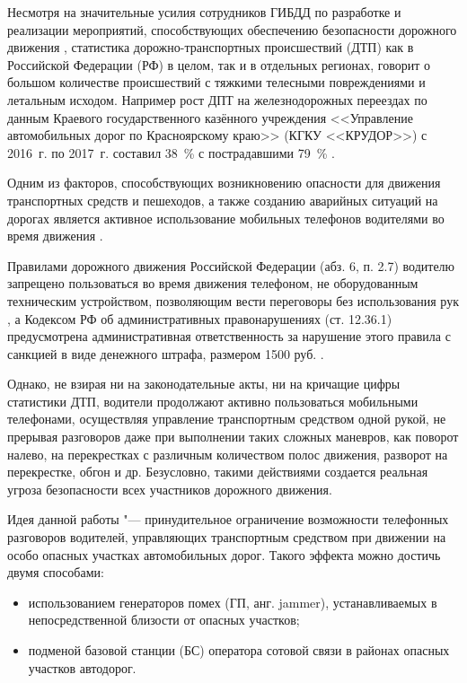 
Несмотря на значительные усилия сотрудников ГИБДД по разработке и реализации мероприятий, способствующих обеспечению безопасности дорожного движения \cite{KrudorCam}, статистика дорожно-транспортных происшествий (ДТП) как в Российской Федерации (РФ) в целом, так и в отдельных регионах, говорит о большом количестве происшествий с тяжкими телесными повреждениями и летальным исходом. Например рост ДПТ на железнодорожных переездах по данным Краевого государственного казённого учреждения <<Управление автомобильных дорог по Красноярскому краю>> (КГКУ <<КРУДОР>>) с 2016~г. по 2017~г. составил 38~\% с пострадавшими 79~\% \cite{KrudorDTP}. 

Одним из факторов, способствующих возникновению опасности для движения транспортных средств и пешеходов, а также созданию аварийных ситуаций на дорогах является активное использование мобильных телефонов водителями во время движения \cite{Pegin2009}.

Правилами дорожного движения Российской Федерации (абз. 6, п. 2.7) водителю запрещено пользоваться во время движения телефоном, не оборудованным техническим устройством, позволяющим вести переговоры без использования рук \cite{PDD}, а Кодексом РФ об административных правонарушениях (ст. 12.36.1) предусмотрена административная ответственность за нарушение этого правила с санкцией в виде денежного штрафа, размером 1500 руб. \cite{KoAP}. 

Однако, не взирая ни на законодательные акты, ни на кричащие цифры статистики ДТП, водители продолжают активно пользоваться мобильными
телефонами, осуществляя управление транспортным средством одной рукой, не прерывая разговоров даже при выполнении таких сложных маневров, как поворот налево, на перекрестках с различным количеством полос движения, разворот на перекрестке, обгон и др. Безусловно, такими действиями создается реальная угроза безопасности всех участников дорожного движения.

Идея данной работы "--- принудительное ограничение возможности телефонных разговоров водителей, управляющих транспортным средством при движении на особо опасных участках автомобильных дорог. Такого эффекта можно достичь двумя способами:
\begin{itemize}
	\item использованием генераторов помех (ГП, анг. jammer), устанавливаемых в непосредственной близости от опасных участков;
	\item подменой базовой станции (БС) оператора сотовой связи в районах опасных участков автодорог. 
\end{itemize}

